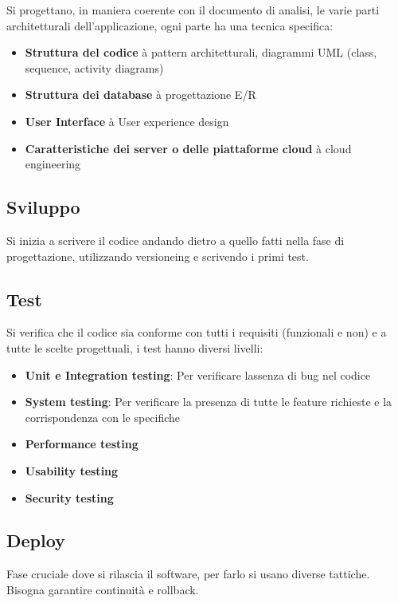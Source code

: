 Si progettano, in maniera coerente con il documento di analisi, le varie
parti architetturali dell'applicazione, ogni parte ha una tecnica
specifica:

\begin{itemize}
\item
  \textbf{Struttura del codice} à pattern architetturali, diagrammi UML
  (class, sequence, activity diagrams)
\item
  \textbf{Struttura dei database} à progettazione E/R
\item
  \textbf{User Interface} à User experience design
\item
  \textbf{Caratteristiche dei server o delle piattaforme cloud} à cloud
  engineering
\end{itemize}

\subsection{Sviluppo}\label{sviluppo}

Si inizia a scrivere il codice andando dietro a quello fatti nella fase
di progettazione, utilizzando versioneing e scrivendo i primi test.

\subsection{Test}\label{test}

Si verifica che il codice sia conforme con tutti i requisiti (funzionali
e non) e a tutte le scelte progettuali, i test hanno diversi livelli:

\begin{itemize}
\item
  \textbf{Unit e Integration testing}: Per verificare
  l\textquotesingle assenza di bug nel codice
\item
  \textbf{System testing}: Per verificare la presenza di tutte le
  feature richieste e la corrispondenza con le specifiche
\item
  \textbf{Performance testing}
\item
  \textbf{Usability testing}
\item
  \textbf{Security testing}
\end{itemize}

\subsection{Deploy}\label{deploy}

Fase cruciale dove si rilascia il software, per farlo si usano diverse
tattiche. Bisogna garantire continuità e rollback.

